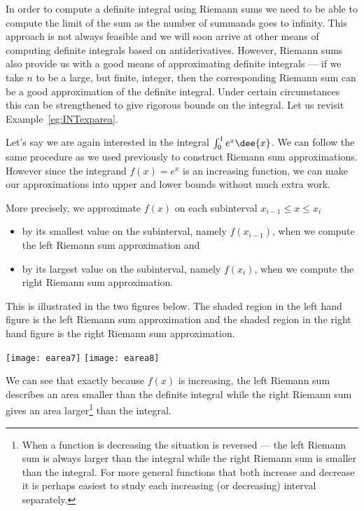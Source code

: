 In order to compute a definite integral using Riemann sums we need to be able to
compute
the limit of the sum as the number of summands goes to infinity. This approach
is not
always feasible and we will soon arrive at other means of computing definite
integrals
based on antiderivatives. However, Riemann sums also provide us with a good
means of
approximating definite integrals --- if we take $n$ to be a large, but finite,
integer,
then the corresponding Riemann sum can be a good approximation of the definite
integral.
Under certain circumstances this can be strengthened to give rigorous bounds on
the
integral. Let us revisit Example~\ref{eg:INTexparea}.
\begin{eg}
Let's say we are again interested in the integral $\int_0^1 e^x\dee{x}$. We can
follow
the same procedure as we used previously to construct Riemann sum
approximations. However
since the integrand $f(x)=e^x$ is an increasing function, we can make our
approximations
into upper and lower bounds without much extra work.

More precisely, we approximate $f(x)$ on each subinterval $x_{i-1}\le x\le x_i$
\begin{itemize}
\item by its smallest value on the subinterval, namely $f(x_{i-1})$, when
we compute the left Riemann sum approximation and

\item by its largest value on the subinterval, namely $f(x_i)$, when we
compute the right Riemann sum approximation.
\end{itemize}
This is illustrated in the two figures below. The shaded region in the
left hand figure is the left Riemann sum approximation and the
shaded region in the right hand figure is the right Riemann sum approximation.
\begin{efig}
\begin{center}
   \texttt{[image: earea7]}\qquad
   \texttt{[image: earea8]}
\end{center}
\end{efig}
We can see that exactly because $f(x)$ is increasing, the left Riemann sum
describes an area smaller than the definite integral while the right Riemann sum
gives an
area larger\footnote{When a function is decreasing the situation is reversed ---
the
left Riemann sum is always larger than the integral while the right Riemann sum
is
smaller than the integral. For more general functions that both increase and
decrease it
is perhaps easiest to study each increasing (or decreasing) interval
separately.} than
the integral.




\end{eg}
